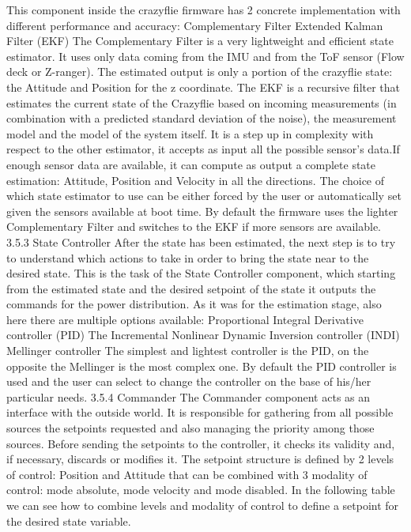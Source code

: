 This component inside the crazyflie firmware has 2 concrete implementation with different performance and accuracy:
Complementary Filter
Extended Kalman Filter (EKF)
The Complementary Filter is a very lightweight and efficient state estimator. It uses only data coming from the IMU and from the ToF sensor (Flow deck or Z-ranger). The estimated output is only a portion of the crazyflie state: the Attitude and Position for the z coordinate.
The EKF is a recursive filter that estimates the current state of the Crazyflie based on incoming measurements (in combination with a predicted standard deviation of the noise), the measurement model and the model of the system itself. 
It is a step up in complexity with respect to the other estimator, it accepts as input all the possible sensor’s data.If enough sensor data are available, it can compute as output a complete state estimation: Attitude, Position and Velocity in all the directions.
The choice of which state estimator to use can be either forced by the user or automatically set given the sensors available at boot time. By default the firmware uses the lighter Complementary Filter and switches to the EKF if more sensors are available.
3.5.3 State Controller
After the state has been estimated, the next step is to try to understand which actions to take in order to bring the state near to the desired state. This is the task of the State Controller component, which starting from the estimated state and the desired setpoint of the state it outputs the commands for the power distribution.
As it was for the estimation stage, also here there are multiple options available:
Proportional Integral Derivative controller (PID) 
The Incremental Nonlinear Dynamic Inversion controller (INDI)
Mellinger controller
The simplest and lightest controller is the PID, on the opposite the Mellinger is the most complex one.
By default the PID controller is used and the user can select to change the controller on the base of his/her particular needs.
3.5.4 Commander
The Commander component acts as an interface with the outside world. It is responsible for gathering from all possible sources the setpoints requested and also managing the priority among those sources. Before sending the setpoints to the controller, it checks its validity and, if necessary, discards or modifies it.
The setpoint structure is defined by 2 levels of control: Position and Attitude that can be combined with 3 modality of control: mode absolute, mode velocity and mode disabled. 
In the following table we can see how to combine levels and modality of control to define a setpoint for the desired state variable.

